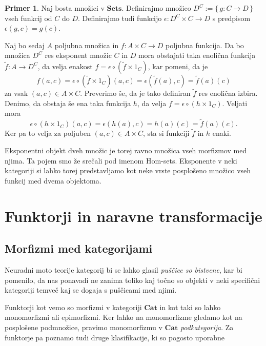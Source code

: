 \documentclass[12pt,a4paper]{book}
\theoremstyle{definition}
\theoremstyle{plain}
\theoremstyle{definition}
\newtheorem{primer}{Primer}[section]
\theoremstyle{remark}
\newcommand{\cat}[1]{\textbf{#1}}
\renewcommand{\set}[1]{\{\,#1\,\}}
\begin{document}
\begin{primer}
Naj bosta množici v $\cat{Sets}$. Definirajmo množico $D^C := \set{g : C \to D}$ vseh funkcij od $C$ do $D$. Definirajmo tudi funkcijo $\epsilon : D^C \times C \to D$ s predpisom $\epsilon(g,c) = g(c)$.

Naj bo sedaj $A$ poljubna množica in $f : A \times C \to D$ poljubna funkcija. Da bo množica $D^C$ res eksponent množic $C$ in $D$ mora obstajati taka enolična funkcija $\widetilde{f} : A \to D^C$, da velja enakost $f = \epsilon \circ (\widetilde{f} \times 1_C)$, kar pomeni, da je
$$f(a,c) = \epsilon \circ (\widetilde{f} \times 1_C)(a,c) = \epsilon(\widetilde{f}(a),c) = \widetilde{f}(a)(c)$$
za vsak $(a,c) \in A \times C$. Preverimo še, da je tako definiran $\widetilde{f}$ res enolična izbira. Denimo, da obstaja še ena taka funkcija $h$, da velja $f = \epsilon \circ (h \times 1_C)$. Veljati mora
$$\epsilon \circ (h \times 1_C)(a,c) = \epsilon(h(a),c) = h(a)(c) = \widetilde{f}(a)(c).$$
Ker pa to velja za poljuben $(a,c) \in A \times C$, sta si funkciji $\widetilde{f}$ in $h$ enaki.

Eksponentni objekt dveh množic je torej ravno množica vseh morfizmov med njima. Ta pojem smo že srečali pod imenom Hom-sets.
Eksponente v neki kategoriji si lahko torej predstavljamo kot neke vrste posplošeno množico vseh funkcij med dvema objektoma. 
\end{primer}

\section{Funktorji in naravne transformacije}

\subsection{Morfizmi med kategorijami}

Neuradni moto teorije kategorij bi se lahko glasil \textit{puščice so bistvene},
kar bi pomenilo, da nas ponavadi ne zanima toliko kaj točno so objekti v neki specifični kategoriji temveč kaj se dogaja s puščicami med njimi.

Funktorji kot vemo so morfizmi v kategoriji $\cat{Cat}$ in kot taki so lahko monomorfizmi ali epimorfizmi. Ker lahko na monomorfizme gledamo kot na posplošene podmnožice, pravimo monomorfizmu v $\cat{Cat}$ \emph{podkategorija}. Za funktorje pa poznamo tudi druge klasifikacije, ki so pogosto uporabne
\end{document}
